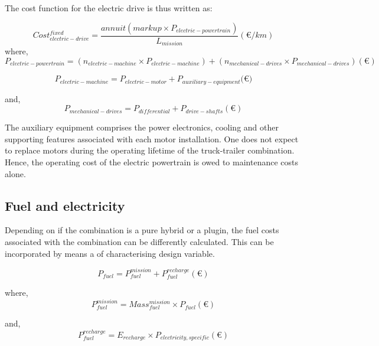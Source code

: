 \documentclass[ExampleMasters.tex]{subfiles}
\begin{document}
			The cost function for the electric drive is thus written as:

			\begin{equation}
				Cost_{electric-drive}^{fixed} = \frac{annuit(markup \times P_{electric-powertrain})}{L_{mission}} (\euro{}/km)
			\end{equation}
			where,
			\begin{equation}
				P_{electric-powertrain} = (n_{electric-machine} \times P_{electric-machine}) + (n_{mechanical-drives} \times P_{mechanical-drives}) (\euro{})
			\end{equation}

			\begin{equation}
				P_{electric-machine} = P_{electric-motor}+P_{auxiliary-equipment} (\euro{)}
			\end{equation}

			and,
			\begin{equation}
				P_{mechanical-drives} = P_{differential}+P_{drive-shafts} (\euro{})
			\end{equation}

			The auxiliary equipment comprises the power electronics, cooling and other supporting features associated with each motor installation. One does not expect to replace motors during the operating lifetime of the truck-trailer combination. Hence, the operating cost of the electric powertrain is owed to maintenance costs alone.

		\subsection{Fuel and electricity}
			Depending on if the combination is a pure hybrid or a plugin, the fuel costs associated with the combination can be differently calculated. This can be incorporated by means a of characterising design variable.

			\begin{equation}
				P_{fuel} = P_{fuel}^{mission}+P_{fuel}^{recharge} (\euro{})
			\end{equation}

			where,
			\begin{equation}
				P_{fuel}^{mission} = Mass_{fuel}^{mission} \times P_{fuel} (\euro{})
			\end{equation}

			and,
			\begin{equation}
				P_{fuel}^{recharge} = E_{recharge} \times P_{electricity, specific} (\euro{})
			\end{equation}
\end{document}
